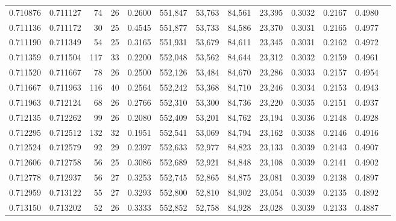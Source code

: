 \begin{tabular}{rrrrrrrrrrrrr}
0.710876 & 0.711127 &     74 &    26 &                                     0.2600 & 551,847 &  53,763 &  84,561 &  23,395 & 0.3032 & 0.2167 & 0.4980 \\
0.711136 & 0.711172 &     30 &    25 &                                     0.4545 & 551,877 &  53,733 &  84,586 &  23,370 & 0.3031 & 0.2165 & 0.4977 \\
0.711190 & 0.711349 &     54 &    25 &                                     0.3165 & 551,931 &  53,679 &  84,611 &  23,345 & 0.3031 & 0.2162 & 0.4972 \\
0.711359 & 0.711504 &    117 &    33 &                                     0.2200 & 552,048 &  53,562 &  84,644 &  23,312 & 0.3032 & 0.2159 & 0.4961 \\
0.711520 & 0.711667 &     78 &    26 &                                     0.2500 & 552,126 &  53,484 &  84,670 &  23,286 & 0.3033 & 0.2157 & 0.4954 \\
0.711667 & 0.711963 &    116 &    40 &                                     0.2564 & 552,242 &  53,368 &  84,710 &  23,246 & 0.3034 & 0.2153 & 0.4943 \\
0.711963 & 0.712124 &     68 &    26 &                                     0.2766 & 552,310 &  53,300 &  84,736 &  23,220 & 0.3035 & 0.2151 & 0.4937 \\
0.712135 & 0.712262 &     99 &    26 &                                     0.2080 & 552,409 &  53,201 &  84,762 &  23,194 & 0.3036 & 0.2148 & 0.4928 \\
0.712295 & 0.712512 &    132 &    32 &                                     0.1951 & 552,541 &  53,069 &  84,794 &  23,162 & 0.3038 & 0.2146 & 0.4916 \\
0.712524 & 0.712579 &     92 &    29 &                                     0.2397 & 552,633 &  52,977 &  84,823 &  23,133 & 0.3039 & 0.2143 & 0.4907 \\
0.712606 & 0.712758 &     56 &    25 &                                     0.3086 & 552,689 &  52,921 &  84,848 &  23,108 & 0.3039 & 0.2141 & 0.4902 \\
0.712778 & 0.712937 &     56 &    27 &                                     0.3253 & 552,745 &  52,865 &  84,875 &  23,081 & 0.3039 & 0.2138 & 0.4897 \\
0.712959 & 0.713122 &     55 &    27 &                                     0.3293 & 552,800 &  52,810 &  84,902 &  23,054 & 0.3039 & 0.2135 & 0.4892 \\
0.713150 & 0.713202 &     52 &    26 &                                     0.3333 & 552,852 &  52,758 &  84,928 &  23,028 & 0.3039 & 0.2133 & 0.4887 \\

\end{tabular}
